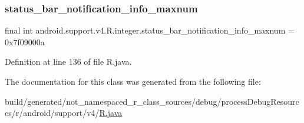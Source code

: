 \subsubsection{\texorpdfstring{status\_bar\_notification\_info\_maxnum}{status\_bar\_notification\_info\_maxnum}}
{\footnotesize\ttfamily final int android.\+support.\+v4.\+R.\+integer.\+status\+\_\+bar\+\_\+notification\+\_\+info\+\_\+maxnum = 0x7f09000a\hspace{0.3cm}{\ttfamily [static]}}



Definition at line 136 of file R.\+java.



The documentation for this class was generated from the following file\+:\begin{DoxyCompactItemize}
\item 
build/generated/not\+\_\+namespaced\+\_\+r\+\_\+class\+\_\+sources/debug/process\+Debug\+Resources/r/android/support/v4/\mbox{\hyperlink{android_2support_2v4_2_r_8java}{R.\+java}}\end{DoxyCompactItemize}
